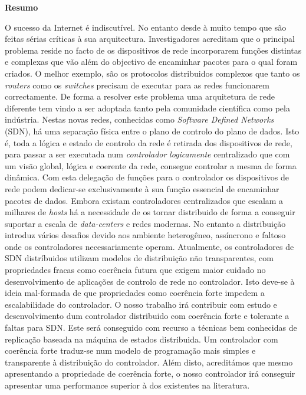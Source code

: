 
\vspace*{2cm}
\begin{center} \Large \bf Resumo
\end{center}
\vspace*{1cm} \setlength{\baselineskip}{0.6cm}

O sucesso da Internet é indiscutível. No entanto desde à muito tempo
que são feitas sérias críticas à sua arquitectura. 
Investigadores acreditam que o principal
problema reside no facto de os dispositivos de rede incorporarem 
funções distintas e complexas que vão além do objectivo de encaminhar pacotes para o qual foram criados. O melhor exemplo, são os protocolos distribuidos complexos que tanto os \emph{routers} como os \emph{switches} precisam de executar para as redes funcionarem correctamente. De forma a resolver este problema
uma arquitetura de rede diferente tem vindo a ser adoptada 
 tanto pela comunidade científica como pela indústria. Nestas novas redes, conhecidas como  \emph{Software Defined Networks} (SDN), há uma separação física entre o plano de controlo do plano de dados. Isto é, toda a lógica e estado de controlo da rede  é retirada dos dispositivos de rede, para passar a ser executada num \emph{controlador} \emph{logicamente} centralizado que com um visão global, lógica e coerente da rede, consegue controlar a mesma de forma dinâmica. Com esta delegação de funções para o controlador os dispositivos de rede podem dedicar-se exclusivamente à sua função essencial de encaminhar pacotes de dados. 
Embora existam controladores centralizados que escalam a milhares de \emph{hosts} há a necessidade de os tornar distribuido de forma a conseguir suportar a escala de \emph{data-centers} e redes modernas. No entanto a distribuição introduz vários desafios devido aos ambiente heterogêneo, assíncrono e faltoso onde os controladores necessariamente operam. 
Atualmente, os controladores de SDN distríbuidos utilizam modelos de distribuição não transparentes, com propriedades fracas como coerência futura que exigem maior cuidado no desenvolvimento de aplicações de controlo de rede no controlador. Isto deve-se à ideia mal-formada de que propriedades como coerência forte impedem a escalabilidade do controlador. 
O nosso trabalho irá contribuir com estudo e desenvolvimento dum controlador distribuido com coerência forte e tolerante a faltas para SDN. Este será conseguido com recurso a técnicas bem conhecidas de replicação baseada na máquina de estados distribuida. Um controlador com coerência forte traduz-se num modelo de programação mais simples e transparente à distribuição do controlador. Além disto, acreditámos que mesmo apresentando a propriedade de coerência forte, o nosso controlador irá conseguir apresentar uma performance superior à dos existentes na literatura. 

